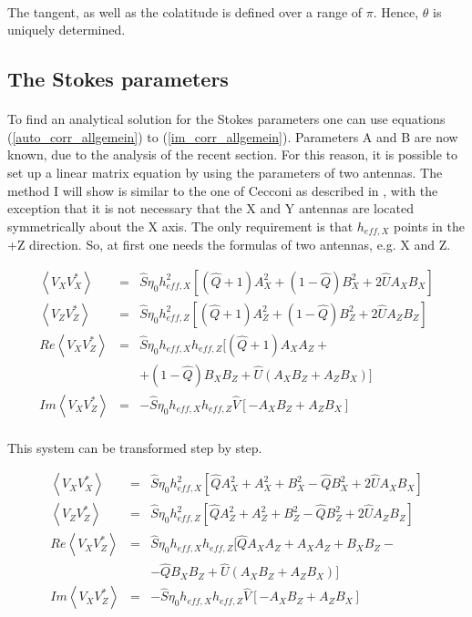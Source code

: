 \documentclass[a4paper,10pt]{thesis}
\begin{document}
\paragraph*{}
The tangent, as well as the colatitude is defined over a range of $\pi$. Hence, $\theta$ is uniquely determined.

\subsection{The Stokes parameters}
\paragraph*{}
To find an analytical solution for the Stokes parameters one can use equations (\ref{auto_corr_allgemein}) to (\ref{im_corr_allgemein}). Parameters A and B are now known, due to the analysis of the recent section. For this reason, it is possible to set up a linear matrix equation by using the parameters of two antennas. The method I will show is similar to the one of Cecconi as described in \cite{cecconi04}, with the exception that it is not necessary that the X and Y antennas are located symmetrically about the X axis. The only requirement is that $h_{eff,X}$  points in the +Z direction. So, at first one needs the formulas of two antennas, e.g. X and Z.

\begin{eqnarray}
\left\langle V_X V_X^{*} \right\rangle &=& \hat{S}\eta_0 h_{eff,X}^2[(\hat{Q}+1) A^2_X + (1-\hat{Q}) B^2_X+ 2 \hat{U}A_X B_X]  \\
\left\langle V_Z V_Z^{*} \right\rangle &=& \hat{S}\eta_0 h_{eff,Z}^2[(\hat{Q}+1) A^2_Z + (1-\hat{Q}) B^2_Z+ 2 \hat{U}A_Z B_Z]  \\
Re \left\langle V_X V_Z^{*}\right\rangle &=& \hat{S}\eta_0 h_{eff,X} h_{eff,Z}[(\hat{Q}+1) A_X A_Z +\\
&&+  (1-\hat{Q}) B_X B_Z + \hat{U} (A_X B_Z + A_Z B_X)] \nonumber \\
Im \left\langle V_X V_Z^{*}\right\rangle &=& -\hat{S}\eta_0 h_{eff,X} h_{eff,Z} \hat{V}[-A_X B_Z + A_Z B_X ]
\end{eqnarray}

\paragraph*{}
This system can be transformed step by step.

\begin{eqnarray}
\left\langle V_X V_X^{*} \right\rangle &=& \hat{S}\eta_0 h_{eff,X}^2[\hat{Q}A^2_X+A^2_X + B^2_X-\hat{Q} B^2_X+ 2 \hat{U}A_X B_X]  \\
\left\langle V_Z V_Z^{*} \right\rangle &=& \hat{S}\eta_0 h_{eff,Z}^2[\hat{Q}A^2_Z+A^2_Z + B^2_Z-\hat{Q} B^2_Z+ 2 \hat{U}A_Z B_Z]  \\
Re \left\langle V_X V_Z^{*}\right\rangle &=& \hat{S}\eta_0 h_{eff,X} h_{eff,Z}[\hat{Q}A_X A_Z+ A_X A_Z +  B_X B_Z- \\
&&-\hat{Q} B_X B_Z +  \hat{U} (A_X B_Z + A_Z B_X)] \nonumber \\
Im \left\langle V_X V_Z^{*}\right\rangle &=& -\hat{S}\eta_0 h_{eff,X} h_{eff,Z} \hat{V}[-A_X B_Z + A_Z B_X ]
\end{eqnarray}
\end{document}
